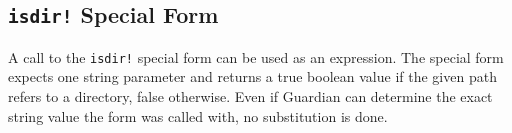 
\subsection{\texttt{isdir!} Special Form}
{
	A call to the \texttt{isdir!} special form can be used as an expression.
	The special form expects one string parameter and returns a true boolean
	value if the given path refers to a directory, false
	otherwise.
	Even if Guardian can determine the exact string value the form was
	called with, no substitution is done.
}
